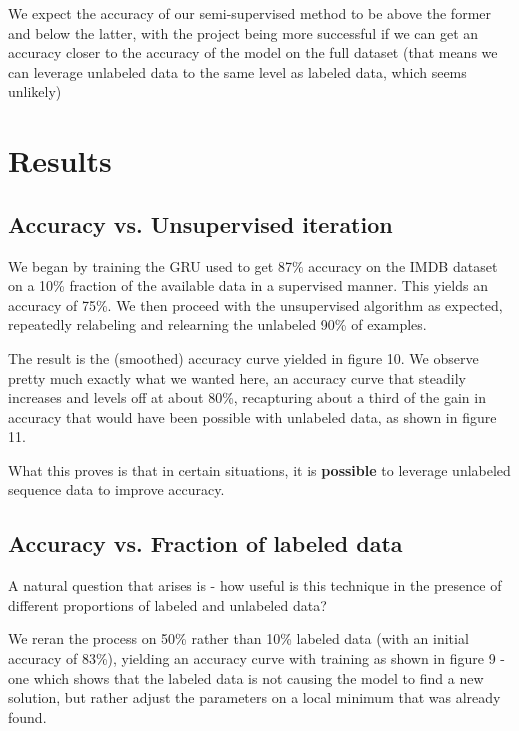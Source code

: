 \documentclass[11pt,letterpaper]{article}
\begin{document}
 We expect the accuracy of our semi-supervised method to be above the former and below the latter, with the project being more successful if we can get an accuracy closer to the accuracy of the model on the full dataset (that means we can leverage unlabeled data to the same level as labeled data, which seems unlikely)
 
 \clearpage
 
 \section{Results}

 
 \subsection{Accuracy vs. Unsupervised iteration}
 
 We began by training the GRU used to get 87\% accuracy on the IMDB dataset on a 10\% fraction of the available data in a supervised manner. This yields an accuracy of 75\%. We then proceed with the unsupervised algorithm as expected, repeatedly relabeling and relearning the unlabeled 90\% of examples.
 
 The result is the (smoothed) accuracy curve yielded in figure 10. We observe pretty much exactly what we wanted here, an accuracy curve that steadily increases and levels off at about 80\%, recapturing about a third of the gain in accuracy that would have been possible with unlabeled data, as shown in figure 11.
 
 What this proves is that in certain situations, it is \textbf{possible} to leverage unlabeled sequence data to improve accuracy.
 
 
 
  \subsection{Accuracy vs. Fraction of labeled data}
  
  A natural question that arises is - how useful is this technique in the presence of different proportions of labeled and unlabeled data?
  
  We reran the process on 50\% rather than 10\% labeled data (with an initial accuracy of 83\%), yielding an accuracy curve with training as shown in figure 9 - one which shows that the labeled data is not causing the model to find a new solution, but rather adjust the parameters on a local minimum that was already found.
  
\end{document}
